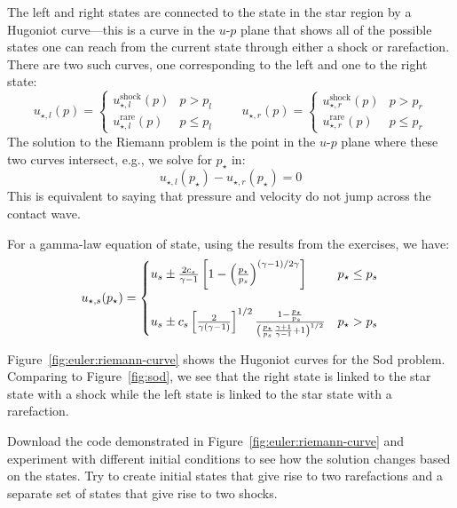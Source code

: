 The left and right states are connected to the state in the star
region by a Hugoniot curve---this is a curve in the $u$-$p$ plane that
shows all of the possible states one can reach from the current state
through either a shock or rarefaction.  There are two such curves, one
corresponding to the left and one to the right state:
\begin{equation}
u_{\star,l}(p) = \begin{cases}
   u_{\star,l}^\mathrm{shock}(p) & p > p_l \\
   u_{\star,l}^\mathrm{rare}(p) & p \le p_l 
   \end{cases}
\qquad
u_{\star,r}(p) = \begin{cases}
   u_{\star,r}^\mathrm{shock}(p) & p > p_r \\
   u_{\star,r}^\mathrm{rare}(p) & p \le p_r 
   \end{cases}
\end{equation}
The solution
to the Riemann problem is the point in the $u$-$p$ plane where these
two curves intersect, e.g., we solve for $p_\star$ in:
\begin{equation}
u_{\star,l}(p_\star) - u_{\star,r}(p_\star) = 0
\end{equation}
This is equivalent to saying that pressure and velocity do not jump
across the contact wave.

For a gamma-law equation of state, using the results from the
exercises, we have:
\begin{equation}
\renewcommand{\arraystretch}{1.5}
u_{\star,s}(p_\star) = \begin{cases}
  u_s \pm \frac{2c_s}{\gamma - 1} \left [ 1 - \left ( \frac{p_\star}{p_s}\right )^{(\gamma - 1)/2\gamma} \right ] & p_\star \le p_s \\
\\
%
  u_s \pm c_s \left [\frac{2}{\gamma(\gamma - 1)}\right]^{1/2} \frac{1 - \frac{p_\star}{p_s}}{\left ( \frac{p_\star}{p_s} \frac{\gamma + 1}{\gamma - 1} + 1\right)^{1/2}} & p_\star > p_s
\end{cases}
\renewcommand{\arraystretch}{1.0}
\end{equation}



Figure~\ref{fig:euler:riemann-curve} shows the Hugoniot curves for the
Sod problem.  Comparing to Figure~\ref{fig:sod}, we see that the right
state is linked to the star state with a shock while the left state is
linked to the star state with a rarefaction.

\begin{exercise}
Download the code demonstrated in Figure~\ref{fig:euler:riemann-curve}
and experiment with different initial conditions to see how the
solution changes based on the states.  Try to create initial states
that give rise to two rarefactions and a separate set of states that
give rise to two shocks.
\end{exercise}

